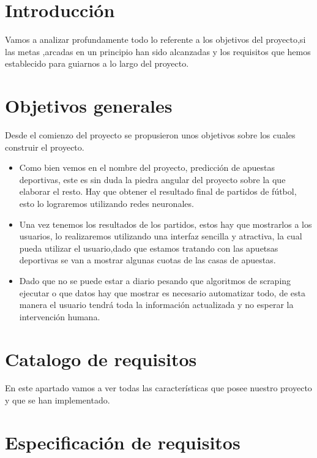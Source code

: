 
\section{Introducción}
Vamos a analizar profundamente  todo lo referente a los objetivos del proyecto,si las metas ,arcadas en un principio han sido alcanzadas y los requisitos que hemos establecido para guiarnos a lo largo del proyecto.
\section{Objetivos generales}
Desde el comienzo del proyecto se propusieron unos objetivos sobre los cuales construir el proyecto.
\begin{itemize}
\item Como bien vemos en el nombre del proyecto, predicción de apuestas deportivas, este es sin duda la piedra angular del proyecto sobre la que elaborar el resto. Hay que obtener el resultado final de partidos de fútbol, esto lo lograremos utilizando redes neuronales.

\item Una vez tenemos los resultados de los partidos, estos hay que mostrarlos a los usuarios, lo realizaremos utilizando una interfaz sencilla y atractiva, la cual pueda utilizar el usuario,dado que estamos tratando con las apuetsas deportivas se van a mostrar algunas cuotas de las casas de apuestas.

\item Dado que no se puede estar a diario pesando que algoritmos de scraping ejecutar o que datos hay que mostrar es necesario automatizar todo, de esta manera el usuario tendrá toda la información actualizada y no esperar la intervención humana.
\end{itemize}
\section{Catalogo de requisitos}
En este apartado vamos a ver todas las características que posee nuestro proyecto y que se han implementado.

\section{Especificación de requisitos}


